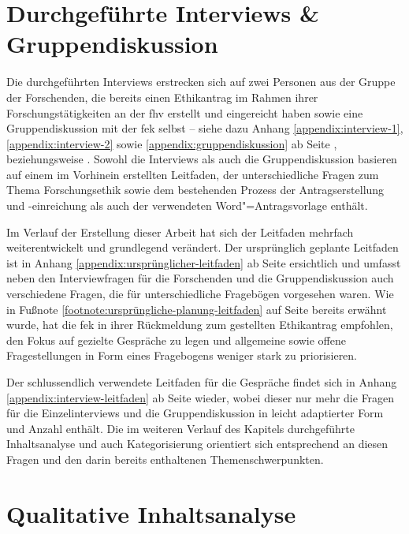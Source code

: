 \documentclass[a4paper,12pt,twoside,numbers=noendperiod]{scrreprt}
\begin{document}
\section{Durchgeführte Interviews \& Gruppendiskussion}
\label{sec:durchgeführte-interviews-gruppendiskussion}

Die durchgeführten Interviews erstrecken sich auf zwei Personen aus der Gruppe der Forschenden, die bereits einen Ethikantrag im Rahmen ihrer Forschungstätigkeiten an der \acl{fhv} erstellt und eingereicht haben sowie eine Gruppendiskussion mit der \ac{fek} selbst -- siehe dazu Anhang \ref{appendix:interview-1}, \ref{appendix:interview-2} sowie \ref{appendix:gruppendiskussion} ab Seite \pageref{appendix:interview-1}, \pageref{appendix:interview-2} beziehungsweise \pageref{appendix:gruppendiskussion}. Sowohl die Interviews als auch die Gruppendiskussion basieren auf einem im Vorhinein erstellten Leitfaden, der unterschiedliche Fragen zum Thema Forschungsethik sowie dem bestehenden Prozess der Antragserstellung und -einreichung als auch der verwendeten Word"=Antragsvorlage enthält.

\medskip

Im Verlauf der Erstellung dieser Arbeit hat sich der Leitfaden mehrfach weiterentwickelt und grundlegend verändert. Der ursprünglich geplante Leitfaden ist in Anhang \ref{appendix:ursprünglicher-leitfaden} ab Seite \pageref{appendix:ursprünglicher-leitfaden} ersichtlich und umfasst neben den Interviewfragen für die Forschenden und die Gruppendiskussion auch verschiedene Fragen, die für unterschiedliche Fragebögen vorgesehen waren. Wie in Fußnote \ref{footnote:ursprüngliche-planung-leitfaden} auf Seite \pageref{footnote:ursprüngliche-planung-leitfaden} bereits erwähnt wurde, hat die \ac{fek} in ihrer Rückmeldung zum gestellten Ethikantrag empfohlen, den Fokus auf gezielte Gespräche zu legen und allgemeine sowie offene Fragestellungen in Form eines Fragebogens weniger stark zu priorisieren.

Der schlussendlich verwendete Leitfaden für die Gespräche findet sich in Anhang \ref{appendix:interview-leitfaden} ab Seite \pageref{appendix:interview-leitfaden} wieder, wobei dieser nur mehr die Fragen für die Einzelinterviews und die Gruppendiskussion in leicht adaptierter Form und Anzahl enthält. Die im weiteren Verlauf des Kapitels durchgeführte Inhaltsanalyse und auch Kategorisierung orientiert sich entsprechend an diesen Fragen und den darin bereits enthaltenen Themenschwerpunkten.

\section{Qualitative Inhaltsanalyse}
\label{sec:qualitative-inhaltsanalyse}
\end{document}
